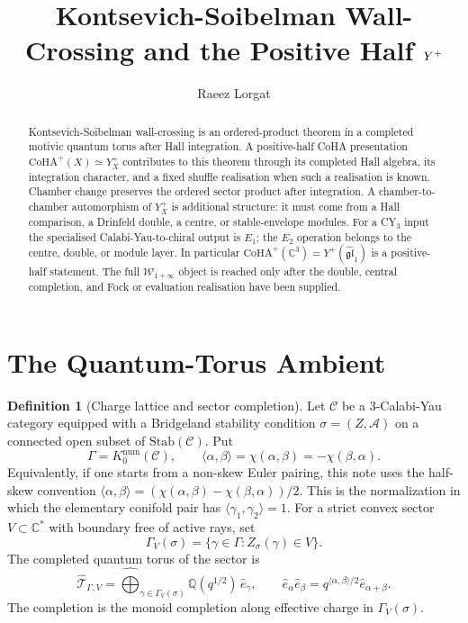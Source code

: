 \documentclass[11pt]{article}
\title{Kontsevich-Soibelman Wall-Crossing and the Positive Half
\texorpdfstring{$\Yplus$}{Y+}}
\author{Raeez Lorgat}
\date{}
\theoremstyle{definition}
\newtheorem{definition}[theorem]{Definition}
\providecommand{\C}{\mathbb{C}}
\providecommand{\Q}{\mathbb{Q}}
\providecommand{\cA}{\mathcal{A}}
\providecommand{\cC}{\mathcal{C}}
\providecommand{\cT}{\mathcal{T}}
\providecommand{\Yplus}{Y^{+}}
\providecommand{\CoHA}{\mathrm{CoHA}}
\providecommand{\Stab}{\mathrm{Stab}}
\begin{document}
\maketitle

\begin{abstract}
Kontsevich-Soibelman wall-crossing is an ordered-product theorem in a
completed motivic quantum torus after Hall integration. A positive-half
CoHA presentation $\CoHA^+(X)\simeq\Yplus_X$ contributes to this theorem
through its completed Hall algebra, its integration character, and a
fixed shuffle realisation when such a realisation is known. Chamber
change preserves the ordered sector product after integration.
A chamber-to-chamber automorphism of $\Yplus_X$ is additional structure:
it must come from a Hall comparison, a Drinfeld double, a centre, or
stable-envelope modules. For a CY$_3$ input the specialised
Calabi-Yau-to-chiral output is $E_1$; the $E_2$ operation belongs to the
centre, double, or module layer. In particular
$\CoHA^+(\C^3)=\Yplus(\widehat{\mathfrak{gl}}_1)$ is a positive-half
statement. The full $\mathcal W_{1+\infty}$ object is reached only after
the double, central completion, and Fock or evaluation realisation have
been supplied.
\end{abstract}

\section{The Quantum-Torus Ambient}

\begin{definition}[Charge lattice and sector completion]
Let $\cC$ be a $3$-Calabi-Yau category equipped with a Bridgeland
stability condition $\sigma=(Z,\cA)$ on a connected open subset of
$\Stab(\cC)$. Put
\[
 \Gamma=K^{\mathrm{num}}_0(\cC),\qquad
 \langle \alpha,\beta\rangle
   =\chi(\alpha,\beta)
   =-\chi(\beta,\alpha).
\]
Equivalently, if one starts from a non-skew Euler pairing, this note
uses the half-skew convention
$\langle\alpha,\beta\rangle=(\chi(\alpha,\beta)-\chi(\beta,\alpha))/2$.
This is the normalization in which the elementary conifold pair has
$\langle\gamma_1,\gamma_2\rangle=1$.
For a strict convex sector $V\subset \C^*$ with boundary free of active
rays, set
\[
 \Gamma_V(\sigma)=\{\gamma\in\Gamma : Z_\sigma(\gamma)\in V\}.
\]
The completed quantum torus of the sector is
\[
 \widehat{\cT}_{\Gamma,V}
 =
 \widehat{\bigoplus}_{\gamma\in\Gamma_V(\sigma)}
 \Q(q^{1/2})\,\hat e_\gamma,
 \qquad
 \hat e_\alpha\hat e_\beta
 =
 q^{\langle\alpha,\beta\rangle/2}\hat e_{\alpha+\beta}.
\]
The completion is the monoid completion along effective charge in
$\Gamma_V(\sigma)$.
\end{definition}
\end{document}
